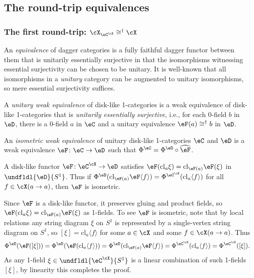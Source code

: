 \documentclass[12pt,reqno]{amsart}
\newcommand{\cl}{\mathrm{cl}}
\newcommand{\psn}{\Phi}
\newcommand{\C}{\eC}
\newcommand{\D}{\eD}
\newcommand{\defn}[1]{\emph{#1}}
\renewcommand{\star}{\dag}
\begin{document}
\subsection{The round-trip equivalences}

\subsubsection{The first round-trip: \texorpdfstring{$\cX_{\eC^\cX}\cong^\dag\cX$}{X(C(X)) = X}}
An \defn{equivalence} of dagger categories is a fully faithful dagger functor between them that is unitarily essentially surjective in that the isomorphisms witnessing essential surjectivity can be chosen to be unitary. It is well-known that all isomorphisms in a \emph{unitary} category can be augmented to unitary isomorphisms, so mere essential surjectivity suffices.

A \defn{unitary weak equivalence} of disk-like 1-categories is a weak equivalence of disk-like 1-categories that is \defn{unitarily essentially surjective}, i.e., for each 0-field $b$ in $\D$, there is a 0-field $a$ in $\C$ and a unitary equivalence $\eF(a)\cong^\star b$ in $\D$.

An \defn{isometric weak equivalence} of unitary disk-like 1-categories $\C$ and $\D$ is a weak equivalence $\eF\colon\C\to\D$ such that $\psn^\C=\psn^\D\circ\widehat\eF$.

\begin{lemma}
\label{lem:functor-commutes-closure}
A disk-like functor $\eF\colon\eC^\cX\to\D$ satisfies $\eF(\cl_a \xi)=\cl_{\eF(a)}\eF(\xi)$ in $\undfldl{\D}{S^1}$. Thus if $\psn^\D(\cl_{\eF(a)}\eF\langle f\rangle)=\psn^{\eC^\cX}(\cl_a\langle f\rangle)$ for all $f\in\cX(a\to a)$, then $\eF$ is isometric.
\end{lemma}

\begin{pf}
Since $\eF$ is a disk-like functor, it preserves gluing and product fields, so $\eF(\cl_a \xi) = \cl_{\eF(a)}\eF(\xi)$ as 1-fields. To see $\eF$ is isometric, note that by local relations any string diagram $\xi$ on $S^1$ is represented by a single-vertex string diagram on $S^1$, so $[\xi] = \cl_a\langle f\rangle$ for some $a\in\cX$ and some $f\in\cX(a\to a)$. Thus
\[
    \psn^\D(\eF([\xi])) = \psn^\D(\eF(\cl_a \langle f\rangle)) = \psn^\D(\cl_{\eF(a)}\eF\langle f\rangle) = \psn^{\eC^\cX}(\cl_a \langle f\rangle ) = \psn^{\eC^\cX}([\xi]).
\]
As any 1-field $\xi\in\undfldl{\eC^\cX}{S^1}$ is a linear combination of such 1-fields $[\xi]$, by linearity this completes the proof.
\end{pf}
\end{document}
